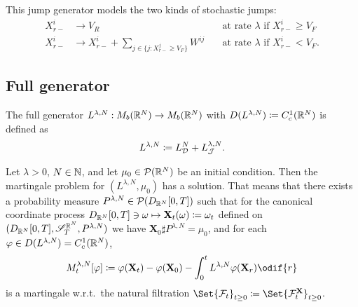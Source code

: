 \smallskip

This jump generator models the two kinds of stochastic jumps:
\begin{align}
  X_{r-}^i & \to V_R                                                           & \quad\text{at rate } \lambda \text{ if } X_{r-}^i \geq V_F \\
  X_{r-}^i & \to X_{r-}^i + \sum_{j \in \{j : X_{r-}^j \geq V_F\}} W^{ij} & \quad\text{at rate } \lambda \text{ if } X_{r-}^i < V_F.
\end{align}


\subsection{Full generator}

The full generator \(L^{\lambda, N} : M_b(\mathbb{R}^N) \to M_b(\mathbb{R}^N)\) with \( D(L^{\lambda, N}) \coloneqq C_c^1(\mathbb{R}^N) \) is defined as
\begin{equation}
  L^{\lambda, N} \coloneqq L_{\mathcal{D}}^{N} + L_{\mathcal{J}}^{\lambda, N}.
\end{equation}


\begin{theorem}\label{thm:mart-problem-sol}
  Let \(\lambda > 0\), \( N \in \mathbb{N} \), and let \(\mu_0 \in \mathcal{P}(\mathbb{R}^N)\) be an initial condition.
  Then the martingale problem for \((L^{\lambda, N}, \mu_0)\) has a solution. %
  That means that there exists a probability measure \(P^{\lambda, N} \in \mathcal{P}(D_{\mathbb{R}^N}[0,T])\) such that for the canonical coordinate process \(D_{\mathbb{R}^N}[0,T] \ni \mathbf{\omega} \mapsto \mathbf{X}_t(\mathbf{\omega}) \coloneqq \mathbf{\omega}_t\) defined on \((D_{\mathbb{R}^N}[0,T], \mathscr{S}_T^{\mathbb{R}^N}, P^{\lambda, N})\) we have \( \bm{X}_0 \sharp P^{\lambda, N} = \mu_0 \), and for each \(\varphi \in D(L^{\lambda, N}) = C_c^1(\mathbb{R}^N)\),
  \begin{equation}\label{eq:M-def}
    M_t^{\lambda, N}[\varphi]
    \coloneqq \varphi(\bm{X}_t) - \varphi(\bm{X}_0) - \int_0^t L^{\lambda, N} \varphi(\bm{X}_r) \odif{r}
  \end{equation}
  is a martingale w.r.t.\ the natural filtration \(\Set{\cF_t}_{t\geq0} \coloneqq \Set{\cF_t^\bm{X}}_{t\geq0}\).
\end{theorem}

